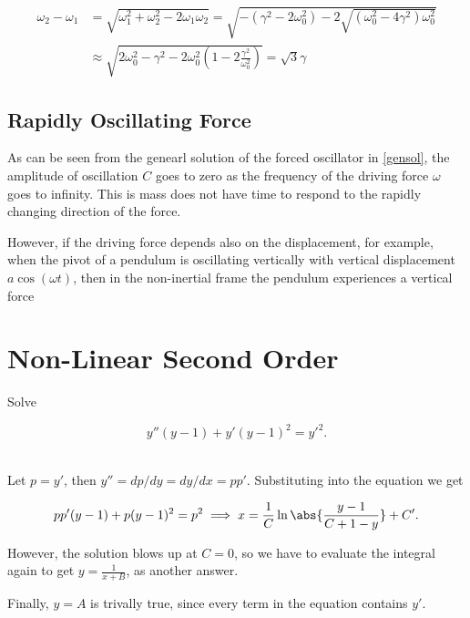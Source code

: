 \documentclass[english,a4paper,12pt]{report}
\begin{document}
\begin{equation}
    \begin{aligned} 
    \omega _{2} - \omega _{1} &= \sqrt{\omega _{1}^2+\omega _{2}^2-2\omega _{1}\omega _{2}} = \sqrt{-(\gamma ^2-2\omega _{0}^2 ) -2 \sqrt{(\omega _{0}^2 - 4\gamma ^2 )\omega _{0}^2 } } \\ &\approx \sqrt{2\omega _{0}^2 -\gamma ^2 - 2\omega _{0}^2 \left( 1 -2\frac{\gamma ^2}{\omega _{0}^2 }  \right)  } = \sqrt{3}\gamma  
    \end{aligned} 
\end{equation}

\subsection{Rapidly Oscillating Force}

As can be seen from the genearl solution of the forced oscillator in \cref{gensol}, the amplitude of oscillation \(C\) goes to zero as the frequency of the driving force \(\omega \) goes to infinity. This is mass does not have time to respond to the rapidly changing direction of the force. 

However, if the driving force depends also on the displacement, for example, when the pivot of a pendulum is oscillating vertically with vertical displacement \(a \cos (\omega t)\), then in the non-inertial frame the pendulum experiences a vertical force   



\section{Non-Linear Second Order}

{Solve 

\begin{equation}
    y''(y-1)+y'(y-1)^2=y'^2.
\end{equation}~
}
{Let \(p = y'\), then \( y''= dp /dy = dy /dx = p p'  \). Substituting into the equation we get

\begin{equation}
    p p' (y-1) + p(y-1)^2 = p^2 \implies x = \frac{1}{C} \ln \abs{\frac{y-1}{C+1-y} } +C'. 
\end{equation}

However, the solution blows up at \(C = 0\), so we have to evaluate the integral again to get \(y = \frac{1}{x+B} \), as another answer. 

Finally, \(y = A\) is trivally true, since every term in the equation contains \(y'\). 
}
\end{document}

